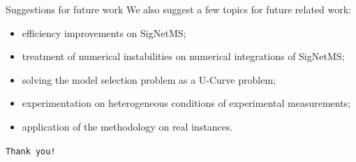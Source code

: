 \documentclass{beamer}
\begin{document}
\begin{frame}{Suggestions for future work}
We also suggest a few topics for future related work:
\begin{itemize}
    \item{efficiency improvements on SigNetMS;}
        \pause
    \item{treatment of numerical instabilities on numerical integrations
        of SigNetMS;}
        \pause
    \item{solving the model selection problem as a U-Curve problem;}
        \pause
    \item{experimentation on heterogeneous conditions of experimental
        measurements;}
        \pause
    \item{application of the methodology on real instances.}
\end{itemize}
\end{frame}

\begin{frame}{}
\begin{center}
    \texttt{Thank you!}
\end{center}
\end{frame}
\end{document}
